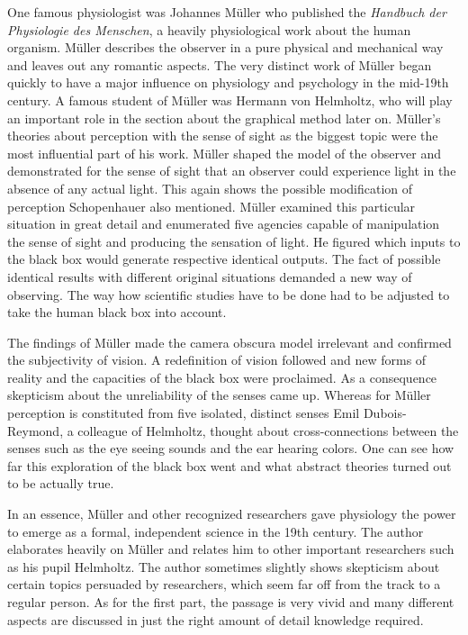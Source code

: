\documentclass[12pt,a4paper]{article}
\begin{document}
One famous physiologist was Johannes Müller who published the {\it{Handbuch der Physiologie des Menschen}},
a heavily physiological work about the human organism. Müller describes the observer in a pure physical and
mechanical way and leaves out any romantic aspects. The very distinct work of Müller began quickly to have
a major influence on physiology and psychology in the mid-19th century. A famous student of Müller was
Hermann von Helmholtz, who will play an important role in the section about the graphical method later on.
Müller's theories about perception with the sense of sight as the biggest topic were the most influential
part of his work. Müller shaped the model of the observer and demonstrated for the sense of sight that
an observer could experience light in the absence of any actual light.
This again shows the possible modification of perception Schopenhauer also mentioned.
Müller examined this particular situation in great detail and enumerated five agencies capable of 
manipulation the sense of sight and producing the sensation of light.
He figured which inputs to the black box would generate respective identical outputs.
The fact of possible identical results with different original situations demanded a new way of
observing. The way how scientific studies have to be done had to be adjusted to take the human
black box into account.

The findings of Müller made the camera obscura model irrelevant and confirmed the subjectivity of vision.
A redefinition of vision followed and new forms of reality and the capacities of the black box were
proclaimed. As a consequence skepticism  about the unreliability of the senses came up.
Whereas for Müller perception is constituted from five isolated, distinct senses Emil Dubois-Reymond,
a colleague of Helmholtz, thought about cross-connections between the senses such as the eye seeing
sounds and the ear hearing colors. One can see how far this exploration of the black box went and
what abstract theories turned out to be actually true.

In an essence, Müller and other recognized researchers gave physiology the power to emerge as a
formal, independent science in the 19th century. The author elaborates heavily on Müller and relates him
to other important researchers such as his pupil Helmholtz. The author sometimes slightly shows
skepticism about certain topics persuaded by researchers, which seem far off from the track to a regular person.
As for the first part, the passage is very vivid and many different aspects are discussed in
just the right amount of detail knowledge required.
\end{document}
